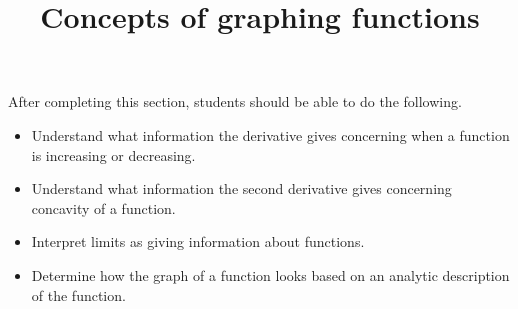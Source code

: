 \documentclass{ximera}
\title{Concepts of graphing functions}
\begin{document}
\begin{abstract}
\end{abstract}

\maketitle

\begin{sectionOutcomes}

After completing this section, students should be able to do the following.

\begin{itemize}
\item Understand what information the derivative gives concerning when
  a function is increasing or decreasing.
\item Understand what information the second derivative gives
  concerning concavity of a function.
\item Interpret limits as giving information about functions.
\item Determine how the graph of a function looks based on an analytic
  description of the function.
\end{itemize}

\end{sectionOutcomes}
\end{document}
